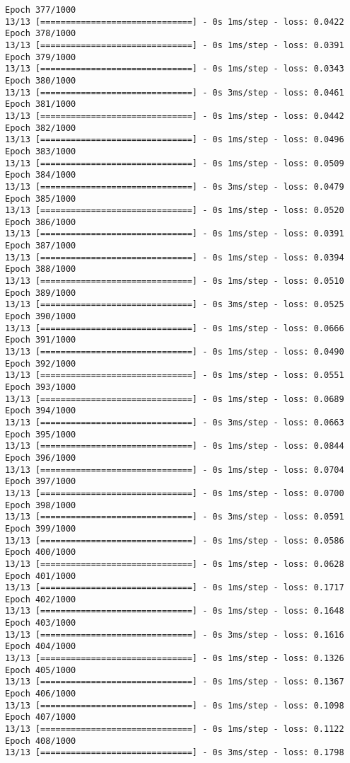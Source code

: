 \documentclass[11pt]{article}
\begin{document}
\begin{Verbatim}[commandchars=\\\{\}]
Epoch 377/1000
13/13 [==============================] - 0s 1ms/step - loss: 0.0422
Epoch 378/1000
13/13 [==============================] - 0s 1ms/step - loss: 0.0391
Epoch 379/1000
13/13 [==============================] - 0s 1ms/step - loss: 0.0343
Epoch 380/1000
13/13 [==============================] - 0s 3ms/step - loss: 0.0461
Epoch 381/1000
13/13 [==============================] - 0s 1ms/step - loss: 0.0442
Epoch 382/1000
13/13 [==============================] - 0s 1ms/step - loss: 0.0496
Epoch 383/1000
13/13 [==============================] - 0s 1ms/step - loss: 0.0509
Epoch 384/1000
13/13 [==============================] - 0s 3ms/step - loss: 0.0479
Epoch 385/1000
13/13 [==============================] - 0s 1ms/step - loss: 0.0520
Epoch 386/1000
13/13 [==============================] - 0s 1ms/step - loss: 0.0391
Epoch 387/1000
13/13 [==============================] - 0s 1ms/step - loss: 0.0394
Epoch 388/1000
13/13 [==============================] - 0s 1ms/step - loss: 0.0510
Epoch 389/1000
13/13 [==============================] - 0s 3ms/step - loss: 0.0525
Epoch 390/1000
13/13 [==============================] - 0s 1ms/step - loss: 0.0666
Epoch 391/1000
13/13 [==============================] - 0s 1ms/step - loss: 0.0490
Epoch 392/1000
13/13 [==============================] - 0s 1ms/step - loss: 0.0551
Epoch 393/1000
13/13 [==============================] - 0s 1ms/step - loss: 0.0689
Epoch 394/1000
13/13 [==============================] - 0s 3ms/step - loss: 0.0663
Epoch 395/1000
13/13 [==============================] - 0s 1ms/step - loss: 0.0844
Epoch 396/1000
13/13 [==============================] - 0s 1ms/step - loss: 0.0704
Epoch 397/1000
13/13 [==============================] - 0s 1ms/step - loss: 0.0700
Epoch 398/1000
13/13 [==============================] - 0s 3ms/step - loss: 0.0591
Epoch 399/1000
13/13 [==============================] - 0s 1ms/step - loss: 0.0586
Epoch 400/1000
13/13 [==============================] - 0s 1ms/step - loss: 0.0628
Epoch 401/1000
13/13 [==============================] - 0s 1ms/step - loss: 0.1717
Epoch 402/1000
13/13 [==============================] - 0s 1ms/step - loss: 0.1648
Epoch 403/1000
13/13 [==============================] - 0s 3ms/step - loss: 0.1616
Epoch 404/1000
13/13 [==============================] - 0s 1ms/step - loss: 0.1326
Epoch 405/1000
13/13 [==============================] - 0s 1ms/step - loss: 0.1367
Epoch 406/1000
13/13 [==============================] - 0s 1ms/step - loss: 0.1098
Epoch 407/1000
13/13 [==============================] - 0s 1ms/step - loss: 0.1122
Epoch 408/1000
13/13 [==============================] - 0s 3ms/step - loss: 0.1798

\end{Verbatim}
\end{document}

